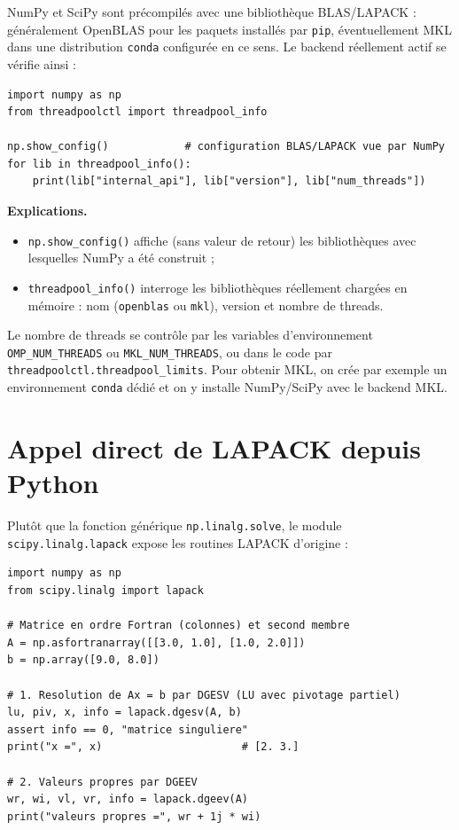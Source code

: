\documentclass[11pt,a4paper]{report}
\theoremstyle{plain}
\theoremstyle{definition}
\theoremstyle{remark}
\begin{document}
NumPy et SciPy sont précompilés avec une bibliothèque BLAS/LAPACK : généralement OpenBLAS pour les paquets installés par \texttt{pip}, éventuellement MKL dans une distribution \texttt{conda} configurée en ce sens. Le backend réellement actif se vérifie ainsi :

\begin{lstlisting}
import numpy as np
from threadpoolctl import threadpool_info

np.show_config()            # configuration BLAS/LAPACK vue par NumPy
for lib in threadpool_info():
    print(lib["internal_api"], lib["version"], lib["num_threads"])
\end{lstlisting}

\noindent\textbf{Explications.}
\begin{itemize}
    \item \texttt{np.show\_config()} affiche (sans valeur de retour) les bibliothèques avec lesquelles NumPy a été construit ;
    \item \texttt{threadpool\_info()} interroge les bibliothèques réellement chargées en mémoire : nom (\texttt{openblas} ou \texttt{mkl}), version et nombre de threads.
\end{itemize}
Le nombre de threads se contrôle par les variables d'environnement \texttt{OMP\_NUM\_THREADS} ou \texttt{MKL\_NUM\_THREADS}, ou dans le code par \texttt{threadpoolctl.threadpool\_limits}. Pour obtenir MKL, on crée par exemple un environnement \texttt{conda} dédié et on y installe NumPy/SciPy avec le backend MKL.

\section{Appel direct de LAPACK depuis Python}

Plutôt que la fonction générique \texttt{np.linalg.solve}, le module \texttt{scipy.linalg.lapack} expose les routines LAPACK d'origine :

\begin{lstlisting}
import numpy as np
from scipy.linalg import lapack

# Matrice en ordre Fortran (colonnes) et second membre
A = np.asfortranarray([[3.0, 1.0], [1.0, 2.0]])
b = np.array([9.0, 8.0])

# 1. Resolution de Ax = b par DGESV (LU avec pivotage partiel)
lu, piv, x, info = lapack.dgesv(A, b)
assert info == 0, "matrice singuliere"
print("x =", x)                      # [2. 3.]

# 2. Valeurs propres par DGEEV
wr, wi, vl, vr, info = lapack.dgeev(A)
print("valeurs propres =", wr + 1j * wi)
\end{lstlisting}
\end{document}
